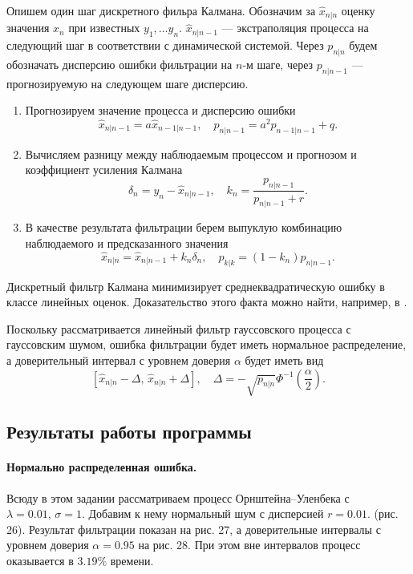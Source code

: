 \documentclass[16pt]{article}
\begin{document}
Опишем один шаг дискретного фильра Калмана. Обозначим за $\hat x_{n|n}$ оценку значения $x_n$ при известных $y_1, \ldots y_n$. $\hat x_{n|n-1}$ --- экстраполяция процесса на следующий шаг в соответствии с динамической системой. Через $p_{n|n}$ будем обозначать дисперсию ошибки фильтрации на $n$-м шаге, через $p_{n|n-1}$ --- прогнозируемую на следующем шаге дисперсию.

\begin{enumerate}
	\item Прогнозируем значение процесса и дисперсию ошибки
$$ \hat x_{n|n-1} = a\hat x_{n-1|n-1}, \quad p_{n|n-1} = a^2 p_{n-1|n-1} + q.$$
	\item Вычисляем разницу между наблюдаемым процессом и прогнозом и коэффициент усиления Калмана
$$ \delta_{n} = y_n - \hat x_{n|n-1}, \quad k_n = \dfrac{p_{n|n-1}}{p_{n|n-1} + r}.$$
	\item В качестве результата фильтрации берем выпуклую комбинацию наблюдаемого и предсказанного значения
$$ \hat x_{n|n} = \hat x_{n|n-1} + k_n\delta_n, \quad p_{k|k} = (1 - k_n)p_{n|n-1}. $$
\end{enumerate}

Дискретный фильтр Калмана минимизирует среднеквадратическую ошибку в классе линейных оценок. Доказательство этого факта можно найти, например, в \cite{Ostrem}.

Поскольку рассматривается линейный фильтр гауссовского процесса с гауссовским шумом, ошибка фильтрации будет иметь нормальное распределение, а доверительный интервал с уровнем доверия $\alpha$ будет иметь вид
$$[\hat x_{n|n} - \Delta, \, \hat x_{n|n} + \Delta], \quad \Delta = -\sqrt{p_{n|n}}\Phi^{-1}\left(\dfrac{\alpha}2\right).$$
\subsection{Результаты работы программы}

\paragraph{Нормально распределенная ошибка.} Всюду в этом задании рассматриваем процесс Орнштейна--Уленбека с $\lambda = 0.01, \, \sigma = 1$. Добавим к нему нормальный шум с дисперсией $r = 0.01$. (рис. 26). Результат фильтрации показан на рис. 27, а доверительные интервалы с уровнем доверия $\alpha = 0.95$ на рис. 28. При этом вне интервалов процесс оказывается в $3.19\%$ времени.
\end{document}
